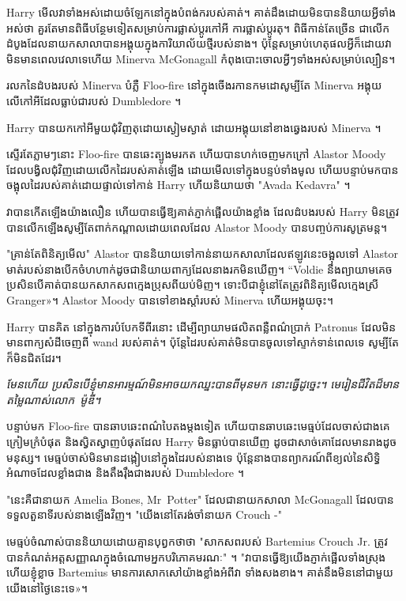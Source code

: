 Harry មើលវាទាំងអស់ដោយចំឡែកនៅក្នុងបំពង់ករបស់គាត់។ គាត់ដឹងដោយមិនបាននិយាយអ្វីទាំងអស់ថា គួរតែមានពិធីបន្ថែមទៀតសម្រាប់ការផ្លាស់ប្តូរកៅអី ការផ្លាស់ប្តូរតុ។ ពិធី​កាន់​តែ​ច្រើន ជា​លើក​ដំបូង​ដែល​នាយក​សាលា​បាន​អង្គុយ​ក្នុង​ការិយាល័យ​ថ្មី​របស់​នាង។ ប៉ុន្តែសម្រាប់ហេតុផលអ្វីក៏ដោយវាមិនមានពេលវេលាទេហើយ Minerva McGonagall កំពុងបោះចោលអ្វីៗទាំងអស់សម្រាប់ល្បឿន។

រលកនៃដំបងរបស់ Minerva បំភ្លឺ Floo-fire នៅក្នុងចើងរកានកមដោសូម្បីតែ Minerva អង្គុយលើកៅអីដែលធ្លាប់ជារបស់ Dumbledore ។

Harry បានយកកៅអីមួយជុំវិញតុដោយស្ងៀមស្ងាត់ ដោយអង្គុយនៅខាងឆ្វេងរបស់ Minerva ។

ស្ទើរតែភ្លាមៗនោះ Floo-fire បានឆេះត្បូងមរកត ហើយបានហក់ចេញមកក្រៅ Alastor Moody ដែលបង្វិលជុំវិញដោយលើកដៃរបស់គាត់ឡើង ដោយមើលទៅក្នុងបន្ទប់ទាំងមូល ហើយបន្ទាប់មកបានចង្អុលដៃរបស់គាត់ដោយផ្ទាល់ទៅកាន់ Harry ហើយនិយាយថា "Avada Kedavra" ។

វាបានកើតឡើងយ៉ាងលឿន ហើយបានធ្វើឱ្យគាត់ភ្ញាក់ផ្អើលយ៉ាងខ្លាំង ដែលដំបងរបស់ Harry មិនត្រូវបានលើកឡើងសូម្បីតែពាក់កណ្តាលដោយពេលដែល Alastor Moody បានបញ្ចប់ការសូត្រមន្ត។

"គ្រាន់តែពិនិត្យមើល" Alastor បាននិយាយទៅកាន់នាយកសាលាដែលឥឡូវនេះចង្អុលទៅ Alastor មាត់របស់នាងបើកចំហហាក់ដូចជានិយាយពាក្យដែលនាងរកមិនឃើញ។ “Voldie នឹង​ព្យាយាម​គេច​ប្រសិន​បើ​គាត់​បាន​យក​សាកសព​ក្មេង​ប្រុស​ពី​យប់​មិញ។ ទោះ​បី​ជា​ខ្ញុំ​នៅ​តែ​ត្រូវ​ពិនិត្យ​មើល​ក្មេង​ស្រី Granger»។ Alastor Moody បានទៅខាងស្តាំរបស់ Minerva ហើយអង្គុយចុះ។

Harry បានគិត នៅក្នុងការបំបែកទីពីរនោះ ដើម្បីព្យាយាមផលិតពន្លឺពណ៌ប្រាក់ Patronus ដែលមិនមានពាក្យសំដីចេញពី wand របស់គាត់។ ប៉ុន្តែ​ដៃ​របស់​គាត់​មិន​បាន​ចូល​ទៅ​ស្ទាក់​ទាន់​ពេល​ទេ សូម្បី​តែ​ក៏​មិន​ជិត​ដែរ។

\emph{ មែនហើយ ប្រសិនបើខ្ញុំមានអារម្មណ៍មិនអាចយកឈ្នះបានពីមុនមក នោះធ្វើដូច្នេះ។ មេរៀនជីវិតដ៏មានតម្លៃណាស់លោក~ម៉ូឌី។}

បន្ទាប់មក Floo-fire បានឆាបឆេះពណ៌បៃតងម្តងទៀត ហើយបានឆាបឆេះមេធ្មប់ដែលចាស់ជាងគេ ក្រៀមក្រំបំផុត និងស្វិតស្វាញបំផុតដែល Harry មិនធ្លាប់បានឃើញ ដូចជាសាច់គោដែលមានរាងដូចមនុស្ស។ មេធ្មប់ចាស់មិនមានដង្កៀបនៅក្នុងដៃរបស់នាងទេ ប៉ុន្តែនាងបានព្យាករណ៍ពីខ្យល់នៃសិទ្ធិអំណាចដែលខ្លាំងជាង និងតឹងរ៉ឹងជាងរបស់ Dumbledore ។

"នេះគឺជានាយក Amelia Bones, Mr~Potter" ដែលជានាយកសាលា McGonagall ដែលបានទទួលតួនាទីរបស់នាងឡើងវិញ។ "យើងនៅតែរង់ចាំនាយក Crouch -"

មេធ្មប់ចំណាស់បាននិយាយដោយគ្មានបុព្វកថាថា "សាកសពរបស់ Bartemius Crouch Jr. ត្រូវបានកំណត់អត្តសញ្ញាណក្នុងចំណោមអ្នកបរិភោគមរណៈ" ។ "វាបានធ្វើឱ្យយើងភ្ញាក់ផ្អើលទាំងស្រុង ហើយខ្ញុំខ្លាច Bartemius មានការសោកសៅយ៉ាងខ្លាំងអំពីវា ទាំងសងខាង។ គាត់នឹងមិននៅជាមួយយើងនៅថ្ងៃនេះទេ»។

